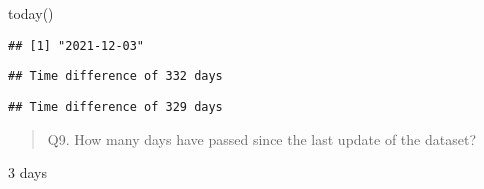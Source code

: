 \documentclass[
]{article}
\newenvironment{Shaded}{\begin{snugshade}}{\end{snugshade}}
\newcommand{\DecValTok}[1]{\textcolor[rgb]{0.00,0.00,0.81}{#1}}
\newcommand{\FunctionTok}[1]{\textcolor[rgb]{0.00,0.00,0.00}{#1}}
\newcommand{\NormalTok}[1]{#1}
\newcommand{\OtherTok}[1]{\textcolor[rgb]{0.56,0.35,0.01}{#1}}
\newcommand{\SpecialCharTok}[1]{\textcolor[rgb]{0.00,0.00,0.00}{#1}}
\begin{document}
\begin{Shaded}
\begin{Highlighting}[]
\FunctionTok{today}\NormalTok{()}
\end{Highlighting}
\end{Shaded}

\begin{verbatim}
## [1] "2021-12-03"
\end{verbatim}

\begin{Shaded}
\end{Shaded}

\begin{Shaded}
\end{Shaded}

\begin{verbatim}
## Time difference of 332 days
\end{verbatim}

\begin{Shaded}
\end{Shaded}

\begin{verbatim}
## Time difference of 329 days
\end{verbatim}

\begin{quote}
Q9. How many days have passed since the last update of the dataset?
\end{quote}

3 days

\begin{Shaded}
\end{Shaded}
\end{document}
